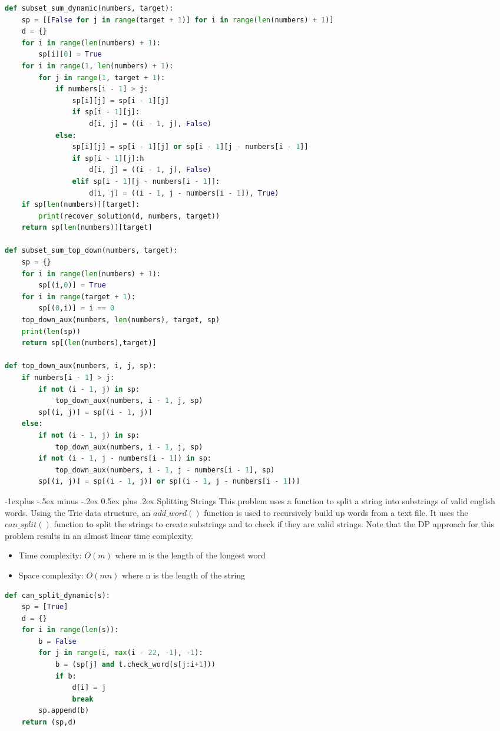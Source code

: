 \documentclass[letterpaper, 8pt]{extarticle}
\makeatletter
\renewcommand{\subsection}{\@startsection{subsection}{2}{0mm}%
                                {-1explus -.5ex minus -.2ex}%
                                {0.5ex plus .2ex}%
                                {\normalfont\small\bfseries}}
\makeatother
\begin{document}
\begin{multicols*}{5}
\begin{lstlisting}[language=Python]
def subset_sum_dynamic(numbers, target):
    sp = [[False for j in range(target + 1)] for i in range(len(numbers) + 1)]
    d = {}
    for i in range(len(numbers) + 1):
        sp[i][0] = True
    for i in range(1, len(numbers) + 1):
        for j in range(1, target + 1):
            if numbers[i - 1] > j:
                sp[i][j] = sp[i - 1][j]
                if sp[i - 1][j]:
                    d[i, j] = ((i - 1, j), False)
            else:
                sp[i][j] = sp[i - 1][j] or sp[i - 1][j - numbers[i - 1]]
                if sp[i - 1][j]:h
                    d[i, j] = ((i - 1, j), False)
                elif sp[i - 1][j - numbers[i - 1]]:
                    d[i, j] = ((i - 1, j - numbers[i - 1]), True)
    if sp[len(numbers)][target]:
        print(recover_solution(d, numbers, target))
    return sp[len(numbers)][target]

def subset_sum_top_down(numbers, target):
    sp = {}
    for i in range(len(numbers) + 1):
        sp[(i,0)] = True
    for i in range(target + 1):
        sp[(0,i)] = i == 0
    top_down_aux(numbers, len(numbers), target, sp)
    print(len(sp))
    return sp[(len(numbers),target)]

def top_down_aux(numbers, i, j, sp):
    if numbers[i - 1] > j:
        if not (i - 1, j) in sp:
            top_down_aux(numbers, i - 1, j, sp)
        sp[(i, j)] = sp[(i - 1, j)]
    else:
        if not (i - 1, j) in sp:
            top_down_aux(numbers, i - 1, j, sp)
        if not (i - 1, j - numbers[i - 1]) in sp:
            top_down_aux(numbers, i - 1, j - numbers[i - 1], sp)
        sp[(i, j)] = sp[(i - 1, j)] or sp[(i - 1, j - numbers[i - 1])]
\end{lstlisting}

\subsection{Splitting Strings}
This problem uses a function to split a string into substrings of valid english words. Using the Trie data structure, an $add\_word()$ function is used to recursively build up words from a text file. It uses the $can\_split()$ function to split the strings to create substrings and to check if they are valid strings. Note that the DP approach for this problem results in an almost linear time complexity.
\begin{itemize}
    \item Time complexity: $O(m)$ where m is the length of the longest word
    \item Space complexity: $O(mn)$ where n is the length of the string
\end{itemize}
\begin{lstlisting}[language=Python]
def can_split_dynamic(s):
    sp = [True]
    d = {}
    for i in range(len(s)):
        b = False
        for j in range(i, max(i - 22, -1), -1):
            b = (sp[j] and t.check_word(s[j:i+1]))
            if b:
                d[i] = j
                break
        sp.append(b)
    return (sp,d)
\end{lstlisting}


\end{multicols*}
\end{document}
